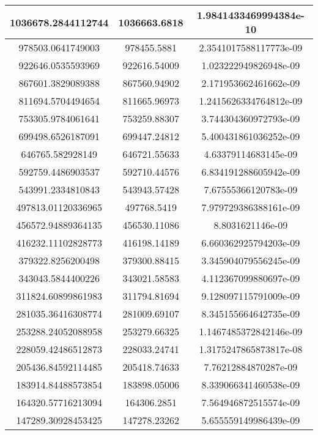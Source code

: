 \begin{longtable}[!h]{|c|c|c|}
    \hline
    1036678.2844112744 & 1036663.6818 & 1.9841433469994384e-10\\
    \hline
    978503.0641749003 & 978455.5881 & 2.3541017588117773e-09\\
    \hline
    922646.0535593969 & 922616.54009 & 1.023222949826948e-09\\
    \hline
    867601.3829089388 & 867560.94902 & 2.171953662461662e-09\\
    \hline
    811694.5704494654 & 811665.96973 & 1.2415626334764812e-09\\
    \hline
    753305.9784061641 & 753259.88307 & 3.744304360972793e-09\\
    \hline
    699498.6526187091 & 699447.24812 & 5.400431861036252e-09\\
    \hline
    646765.582928149 & 646721.55633 & 4.63379114683145e-09\\
    \hline
    592759.4486903537 & 592710.44576 & 6.834191288605942e-09\\
    \hline
    543991.2334810843 & 543943.57428 & 7.67555366120783e-09\\
    \hline
    497813.01120336965 & 497768.5419 & 7.979729386388161e-09\\
    \hline
    456572.94889364135 & 456530.11086 & 8.8031621146e-09\\
    \hline
    416232.11102828773 & 416198.14189 & 6.660362925794203e-09\\
    \hline
    379322.8256200498 & 379300.88415 & 3.345904079556245e-09\\
    \hline
    343043.5844400226 & 343021.58583 & 4.112367099880697e-09\\
    \hline
    311824.60899861983 & 311794.81694 & 9.128097115791009e-09\\
    \hline
    281035.36416308774 & 281009.69107 & 8.345155664642735e-09\\
    \hline
    253288.24052088958 & 253279.66325 & 1.1467485372842146e-09\\
    \hline
    228059.42486512873 & 228033.24741 & 1.3175247865873817e-08\\
    \hline
    205436.84592114485 & 205418.74633 & 7.76212884870287e-09\\
    \hline
    183914.84488573854 & 183898.05006 & 8.339066341460538e-09\\
    \hline
    164320.57716213094 & 164306.2851 & 7.564946872515574e-09\\
    \hline
    147289.30928453425 & 147278.23262 & 5.655559149986439e-09\\

\end{longtable}
